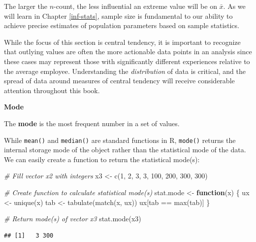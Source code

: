 \documentclass[
]{book}
\newenvironment{Shaded}{\begin{snugshade}}{\end{snugshade}}
\newcommand{\CommentTok}[1]{\textcolor[rgb]{0.56,0.35,0.01}{\textit{#1}}}
\newcommand{\ControlFlowTok}[1]{\textcolor[rgb]{0.13,0.29,0.53}{\textbf{#1}}}
\newcommand{\DecValTok}[1]{\textcolor[rgb]{0.00,0.00,0.81}{#1}}
\newcommand{\FunctionTok}[1]{\textcolor[rgb]{0.00,0.00,0.00}{#1}}
\newcommand{\NormalTok}[1]{#1}
\newcommand{\OtherTok}[1]{\textcolor[rgb]{0.56,0.35,0.01}{#1}}
\newcommand{\SpecialCharTok}[1]{\textcolor[rgb]{0.00,0.00,0.00}{#1}}
\begin{document}
The larger the \(n\)-count, the less influential an extreme value will be on \(\bar{x}\). As we will learn in Chapter \ref{inf-stats}, sample size is fundamental to our ability to achieve precise estimates of population parameters based on sample statistics.

While the focus of this section is central tendency, it is important to recognize that outlying values are often the more actionable data points in an analysis since these cases may represent those with significantly different experiences relative to the average employee. Understanding the \emph{distribution} of data is critical, and the spread of data around measures of central tendency will receive considerable attention throughout this book.

\textbf{Mode}

The \textbf{mode} is the most frequent number in a set of values.

While \texttt{mean()} and \texttt{median()} are standard functions in R, \texttt{mode()} returns the internal storage mode of the object rather than the statistical mode of the data. We can easily create a function to return the statistical mode(s):

\begin{Shaded}
\begin{Highlighting}[]
\CommentTok{\# Fill vector x2 with integers}
\NormalTok{x3 }\OtherTok{\textless{}{-}} \FunctionTok{c}\NormalTok{(}\DecValTok{1}\NormalTok{, }\DecValTok{2}\NormalTok{, }\DecValTok{3}\NormalTok{, }\DecValTok{3}\NormalTok{, }\DecValTok{100}\NormalTok{, }\DecValTok{200}\NormalTok{, }\DecValTok{300}\NormalTok{, }\DecValTok{300}\NormalTok{)}

\CommentTok{\# Create function to calculate statistical mode(s)}
\NormalTok{stat.mode }\OtherTok{\textless{}{-}} \ControlFlowTok{function}\NormalTok{(x) \{}
\NormalTok{  ux }\OtherTok{\textless{}{-}} \FunctionTok{unique}\NormalTok{(x)}
\NormalTok{  tab }\OtherTok{\textless{}{-}} \FunctionTok{tabulate}\NormalTok{(}\FunctionTok{match}\NormalTok{(x, ux))}
\NormalTok{  ux[tab }\SpecialCharTok{==} \FunctionTok{max}\NormalTok{(tab)]}
\NormalTok{\}}

\CommentTok{\# Return mode(s) of vector x3}
\FunctionTok{stat.mode}\NormalTok{(x3)}
\end{Highlighting}
\end{Shaded}

\begin{verbatim}
## [1]   3 300
\end{verbatim}
\end{document}
